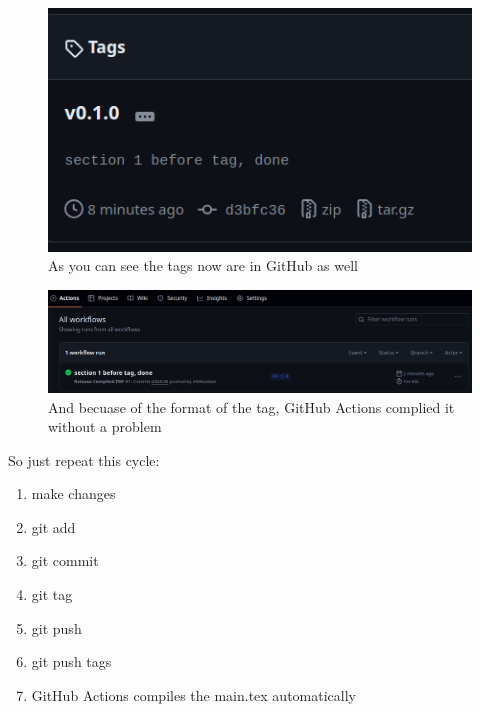 \documentclass{article}
\begin{document}
	\begin{figure}[h]
		\centering
		\includegraphics[width=\textwidth]{images/ss6.png}
		\caption{As you can see the tags now are in GitHub as well}
	\end{figure}
	
	\begin{figure}[h]
		\centering
		\includegraphics[width=\textwidth]{images/ss7.png}
		\caption{And becuase of the format of the tag, GitHub Actions complied it without a problem}
	\end{figure}
	
	So just repeat this cycle:
	\begin{enumerate}
		\item make changes
		\item git add
		\item git commit
		\item git tag
		\item git push
		\item git push tags
		\item GitHub Actions compiles the main.tex automatically
	\end{enumerate}
\end{document}
